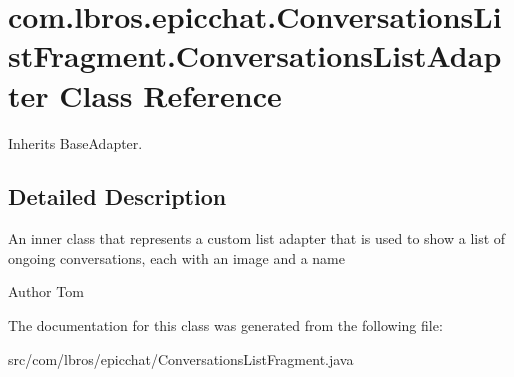 \hypertarget{classcom_1_1lbros_1_1epicchat_1_1_conversations_list_fragment_1_1_conversations_list_adapter}{\section{com.\-lbros.\-epicchat.\-Conversations\-List\-Fragment.\-Conversations\-List\-Adapter Class Reference}
\label{classcom_1_1lbros_1_1epicchat_1_1_conversations_list_fragment_1_1_conversations_list_adapter}
}


Inherits Base\-Adapter.



\subsection{Detailed Description}
An inner class that represents a custom list adapter that is used to show a list of ongoing conversations, each with an image and a name \begin{DoxyAuthor}{Author}
Tom 
\end{DoxyAuthor}


The documentation for this class was generated from the following file\-:\begin{DoxyCompactItemize}
\item 
src/com/lbros/epicchat/Conversations\-List\-Fragment.\-java\end{DoxyCompactItemize}
